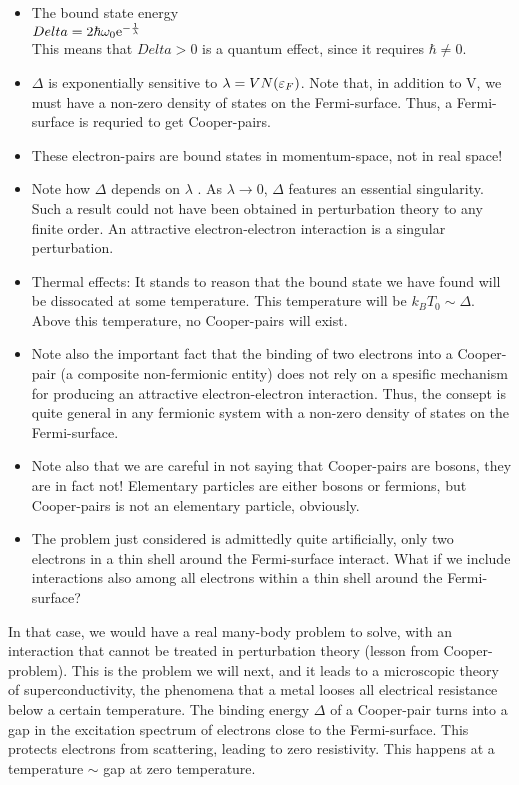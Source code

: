 \begin{itemize}
	\item The bound state energy \\ $Delta = 2\hbar \omega_0 \mathrm{e}^{-\frac{1}{\lambda}}$ \\ This means that $Delta > 0$ is a quantum effect, since it requires $\hbar \neq 0$. 
	\item $\Delta$ is exponentially sensitive to $\lambda = VN(\varepsilon_F)$. Note that, in addition to V, we must have a non-zero density of states on the Fermi-surface. Thus, a Fermi-surface is requried to get Cooper-pairs. 
	\item These electron-pairs are bound states in momentum-space, not in real space! 
	\item Note how $\Delta$ depends on $\lambda$ . As $\lambda \to 0$, $\Delta$ features an essential singularity. Such a result could not have been obtained in perturbation theory to any finite order. An attractive electron-electron interaction is a singular perturbation. 
	\item Thermal effects: It stands to reason that the bound state we have found will be dissocated at some temperature. This temperature will be $k_B T_0 \sim \Delta$. Above this temperature, no Cooper-pairs will exist. 
	\item Note also the important fact that the binding of two electrons into a Cooper-pair (a composite non-fermionic entity) does not rely on a spesific mechanism for producing an attractive electron-electron interaction. Thus, the consept is quite general in any fermionic system with a non-zero density of states on the Fermi-surface. 
	\item Note also that we are careful in not saying that Cooper-pairs are bosons, they are in fact not! Elementary particles are either bosons or fermions, but Cooper-pairs is not an elementary particle, obviously. 
	\item The problem just considered is admittedly quite artificially, only two electrons in a thin shell around the Fermi-surface interact. What if we include interactions also among all electrons within a thin shell around the Fermi-surface? 
\end{itemize}

In that case, we would have a real many-body problem to solve, with an interaction that cannot be treated in perturbation theory (lesson from Cooper-problem). This is the problem we will next, and it leads to a microscopic theory of superconductivity, the phenomena that a metal looses all electrical resistance below a certain temperature. The binding energy $\Delta$ of a Cooper-pair turns into a gap in the excitation spectrum of electrons close to the Fermi-surface. This protects electrons from scattering, leading to zero resistivity. This happens at a temperature $\sim$ gap at zero temperature. 